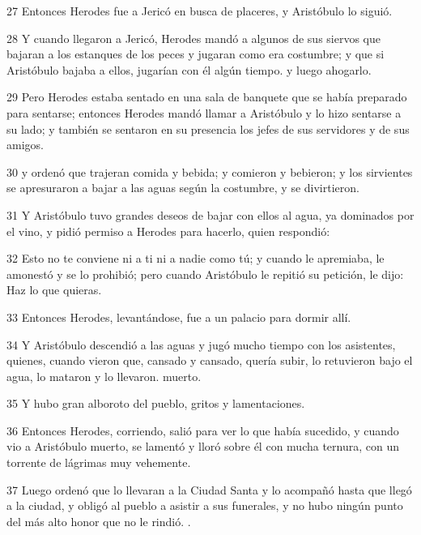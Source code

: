\par 27 Entonces Herodes fue a Jericó en busca de placeres, y Aristóbulo lo siguió.

\par 28 Y cuando llegaron a Jericó, Herodes mandó a algunos de sus siervos que bajaran a los estanques de los peces y jugaran como era costumbre; y que si Aristóbulo bajaba a ellos, jugarían con él algún tiempo. y luego ahogarlo.

\par 29 Pero Herodes estaba sentado en una sala de banquete que se había preparado para sentarse; entonces Herodes mandó llamar a Aristóbulo y lo hizo sentarse a su lado; y también se sentaron en su presencia los jefes de sus servidores y de sus amigos.

\par 30 y ordenó que trajeran comida y bebida; y comieron y bebieron; y los sirvientes se apresuraron a bajar a las aguas según la costumbre, y se divirtieron.

\par 31 Y Aristóbulo tuvo grandes deseos de bajar con ellos al agua, ya dominados por el vino, y pidió permiso a Herodes para hacerlo, quien respondió:

\par 32 Esto no te conviene ni a ti ni a nadie como tú; y cuando le apremiaba, le amonestó y se lo prohibió; pero cuando Aristóbulo le repitió su petición, le dijo: Haz lo que quieras.

\par 33 Entonces Herodes, levantándose, fue a un palacio para dormir allí.

\par 34 Y Aristóbulo descendió a las aguas y jugó mucho tiempo con los asistentes, quienes, cuando vieron que, cansado y cansado, quería subir, lo retuvieron bajo el agua, lo mataron y lo llevaron. muerto.

\par 35 Y hubo gran alboroto del pueblo, gritos y lamentaciones.

\par 36 Entonces Herodes, corriendo, salió para ver lo que había sucedido, y cuando vio a Aristóbulo muerto, se lamentó y lloró sobre él con mucha ternura, con un torrente de lágrimas muy vehemente.

\par 37 Luego ordenó que lo llevaran a la Ciudad Santa y lo acompañó hasta que llegó a la ciudad, y obligó al pueblo a asistir a sus funerales, y no hubo ningún punto del más alto honor que no le rindió. .

